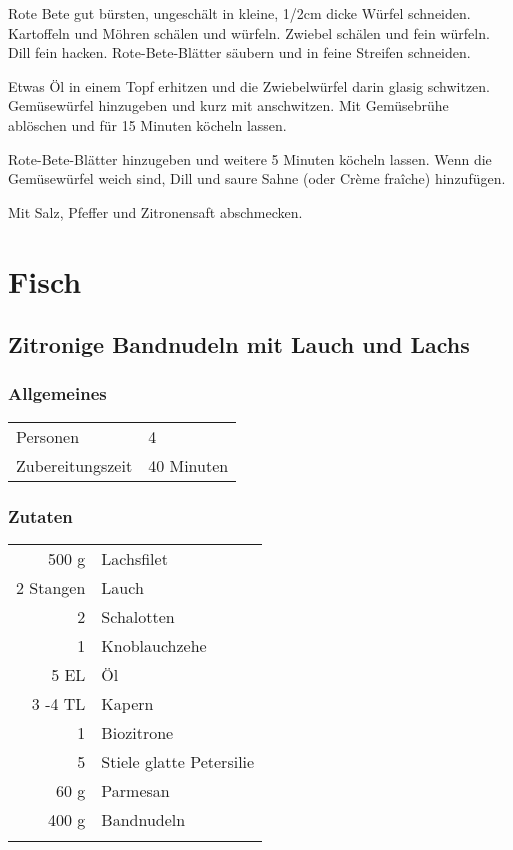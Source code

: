 Rote Bete gut bürsten, ungeschält in kleine, 1/2cm dicke Würfel schneiden. Kartoffeln und Möhren schälen und würfeln. Zwiebel schälen und fein würfeln. Dill fein hacken. Rote-Bete-Blätter säubern und in feine Streifen schneiden.

Etwas Öl in einem Topf erhitzen und die Zwiebelwürfel darin glasig schwitzen. Gemüsewürfel hinzugeben und kurz mit anschwitzen. Mit Gemüsebrühe ablöschen und für 15 Minuten köcheln lassen.

Rote-Bete-Blätter hinzugeben und weitere 5 Minuten köcheln lassen. Wenn die Gemüsewürfel weich sind, Dill und saure Sahne (oder Crème fraîche) hinzufügen.

Mit Salz, Pfeffer und Zitronensaft abschmecken.

\section{Fisch}

\subsection{Zitronige Bandnudeln mit Lauch und Lachs}\label{sec:Lachs:LauchBandnudeln}
\subsubsection*{Allgemeines}
\begin{tabular}{ll}
    Personen         &  4   \\
    Zubereitungszeit & 40 Minuten  \\
\end{tabular} 
\subsubsection*{Zutaten}
\begin{tabular}{r l}
        500 g & Lachsfilet                     \\
    2 Stangen & Lauch                          \\
            2 & Schalotten                     \\
            1 & Knoblauchzehe                  \\
         5 EL & Öl                             \\
      3 -4 TL & Kapern                         \\
            1 & Biozitrone                     \\
            5 & Stiele       glatte Petersilie \\
         60 g & Parmesan                       \\
        400 g & Bandnudeln                     \\
              & 
\end{tabular}

